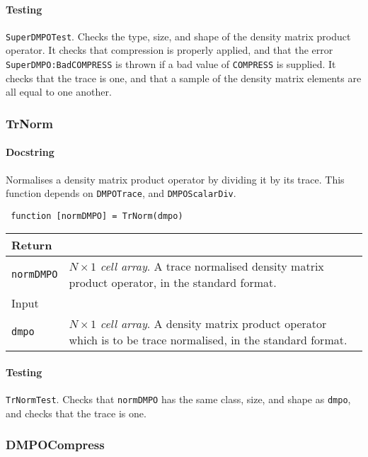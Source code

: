  \paragraph{Testing} \lstinline$SuperDMPOTest$. Checks the type, size, and shape of the density matrix product operator. It checks that compression is properly applied, and that the error \lstinline$SuperDMPO:BadCOMPRESS$ is thrown if a bad value of \lstinline$COMPRESS$ is supplied. It checks that the trace is one, and that a sample of the density matrix elements are all equal to one another.
 
 \subsubsection{TrNorm}
 \paragraph{Docstring} Normalises a density matrix product operator by dividing it by its trace. This function depends on \lstinline$DMPOTrace$, and \lstinline$DMPOScalarDiv$.
 \begin{lstlisting}
 function [normDMPO] = TrNorm(dmpo) \end{lstlisting}
 \begin{longtabu}{X[1,l]X[4,l]}
 \hline
 Return & \\ \hline
 \lstinline$normDMPO$ & \emph{\(N \times 1\) cell array}. A trace normalised density matrix product operator, in the standard format. \\ \hline
 Input & \\ \hline
 \lstinline$dmpo$ & \emph{\(N \times 1\) cell array}. A density matrix product operator which is to be trace normalised, in the standard format. \\
 \hline
 \end{longtabu}
 \paragraph{Testing} \lstinline$TrNormTest$. Checks that \lstinline$normDMPO$ has the same class, size, and shape as \lstinline$dmpo$, and checks that the trace is one.
 
 \subsubsection{DMPOCompress}
